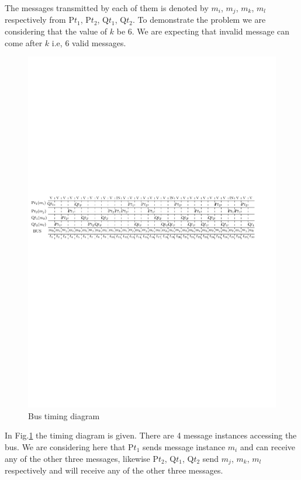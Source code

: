The messages transmitted by each of them is denoted by $m_i$,
$m_j$, $m_k$, $m_l$ respectively from P$t_1$, P$t_2$, Q$t_1$, Q$t_2$. To demonstrate the
problem we are considering that the value of $k$ be $6$. We are expecting that invalid message 
can come after $k$ i.e, $6$ valid messages.
\begin{figure}
\begin{center}
\includegraphics[width=130mm]{prob_1_timing_diagram.pdf}
\end{center}
\caption{Bus timing diagram}
\label{dig1}
\end{figure}

In Fig.\ref{dig1} the timing diagram is given. There are 4 message instances accessing the bus. We are
considering here that P$t_1$ sends message instance $m_i$ and can receive any of the other 
three messages, likewise P$t_2$, Q$t_1$, Q$t_2$ send $m_j$, $m_k$, $m_l$ respectively and will
receive any of the other three messages. 


